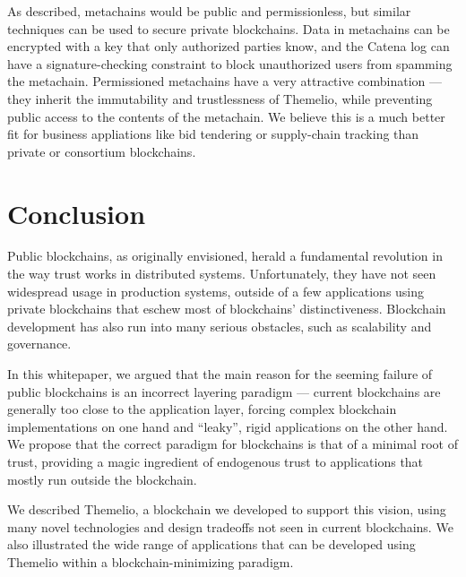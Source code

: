 \documentclass[headinclude,12pt]{scrbook}
\begin{document}
As described, metachains would be public and permissionless, but similar techniques can be used to secure private blockchains. Data in metachains can be encrypted with a key that only authorized parties know, and the Catena log can have a signature-checking constraint to block unauthorized users from spamming the metachain. Permissioned metachains have a very attractive combination --- they inherit the immutability and trustlessness of Themelio, while preventing public access to the contents of the metachain. We believe this is a much better fit for business appliations like bid tendering or supply-chain tracking than private or consortium blockchains.

\chapter*{Conclusion}

Public blockchains, as originally envisioned, herald a fundamental revolution in the way trust works in distributed systems. Unfortunately, they have not seen widespread usage in production systems, outside of a few applications using private blockchains that eschew most of blockchains' distinctiveness. Blockchain development has also run into many serious obstacles, such as scalability and governance.

In this whitepaper, we argued that the main reason for the seeming failure of public blockchains is an incorrect layering paradigm --- current blockchains are generally too close to the application layer, forcing complex blockchain implementations on one hand and ``leaky'', rigid applications on the other hand. We propose that the correct paradigm for blockchains is that of a minimal root of trust, providing a magic ingredient of endogenous trust to applications that mostly run outside the blockchain.

We described Themelio, a blockchain we developed to support this vision, using many novel technologies and design tradeoffs not seen in current blockchains. We also illustrated the wide range of applications that can be developed using Themelio within a blockchain-minimizing paradigm.


\printbibliography
\end{document}
